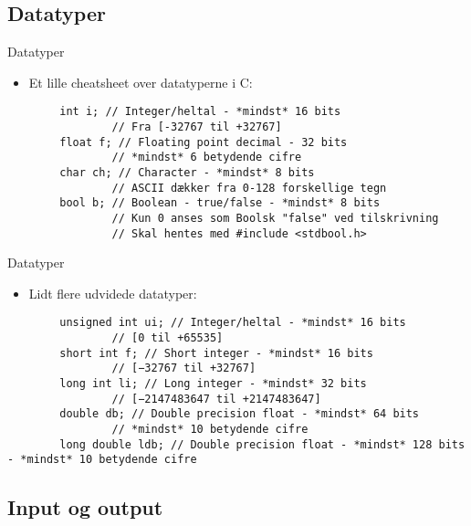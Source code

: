 \documentclass{beamer}
\begin{document}
\subsection{Datatyper}

\begin{frame}[fragile]{Datatyper}
	\begin{itemize}
		\item{Et lille {\color{dkgreen}cheatsheet} over datatyperne i C:}
	\end{itemize}
		\begin{lstlisting}
		int i; // Integer/heltal - *mindst* 16 bits
				// Fra [-32767 til +32767]
		float f; // Floating point decimal - 32 bits
				// *mindst* 6 betydende cifre
		char ch; // Character - *mindst* 8 bits
				// ASCII dækker fra 0-128 forskellige tegn
		bool b; // Boolean - true/false - *mindst* 8 bits
				// Kun 0 anses som Boolsk "false" ved tilskrivning
				// Skal hentes med #include <stdbool.h>
		\end{lstlisting}
\end{frame}


\begin{frame}[fragile]{Datatyper}
	\begin{itemize}
		\item{Lidt flere udvidede datatyper:}
	\end{itemize}
		\begin{lstlisting}
		unsigned int ui; // Integer/heltal - *mindst* 16 bits
				// [0 til +65535]
		short int f; // Short integer - *mindst* 16 bits
				// [−32767 til +32767]
		long int li; // Long integer - *mindst* 32 bits
				// [−2147483647 til +2147483647]
		double db; // Double precision float - *mindst* 64 bits
				// *mindst* 10 betydende cifre
		long double ldb; // Double precision float - *mindst* 128 bits - *mindst* 10 betydende cifre
		\end{lstlisting}
\end{frame}

\subsection{Input og output}
\end{document}
